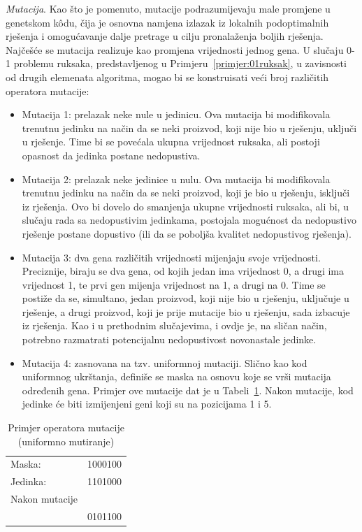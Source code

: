 \documentclass[b5paper, utf8, 11pt, colorlinks]{book}
\theoremstyle{definition}
\begin{document}
\emph{Mutacija}. Kao što je pomenuto, mutacije podrazumijevaju male promjene u genetskom k\^odu, čija je osnovna namjena izlazak iz lokalnih podoptimalnih rješenja i omogućavanje dalje pretrage u cilju pronalaženja boljih rješenja. Najčešće se mutacija realizuje kao promjena vrijednosti jednog gena. U slučaju  0-1 problemu ruksaka, predstavljenog u Primjeru~\ref{primjer:01ruksak}, u zavisnosti od drugih elemenata algoritma, mogao bi se konstruisati veći broj različitih operatora mutacije: 
\begin{itemize}
	\item Mutacija 1: prelazak neke nule u jedinicu. Ova mutacija bi modifikovala trenutnu jedinku na način da se neki proizvod, koji nije bio u rješenju, uključi u rješenje. Time bi se povećala ukupna vrijednost ruksaka, ali postoji opasnost da jedinka postane nedopustiva.
	\item  Mutacija 2: prelazak neke jedinice u nulu. Ova mutacija bi modifikovala trenutnu jedinku na način da se neki proizvod, koji je bio u rješenju, isključi iz rješenja. Ovo bi dovelo do smanjenja ukupne vrijednosti ruksaka, ali bi, u slučaju rada sa nedopustivim jedinkama, postojala mogućnost da nedopustivo rješenje postane dopustivo (ili da se poboljša kvalitet nedopustivog rješenja).
	\item  Mutacija 3: dva gena različitih vrijednosti mijenjaju svoje vrijednosti. Preciznije, biraju se dva gena, od kojih jedan ima vrijednost 0, a drugi ima vrijednost 1, te prvi gen mijenja vrijednost na 1, a drugi na 0. Time se postiže da se, simultano, jedan proizvod, koji nije bio u rješenju, uključuje u rješenje, a drugi proizvod, koji je prije mutacije bio u rješenju, sada izbacuje iz rješenja. Kao i u prethodnim slučajevima, i ovdje je, na sličan način, potrebno razmatrati potencijalnu nedopustivost novonastale jedinke.
	\item Mutacija 4: zasnovana na tzv. uniformnoj mutaciji. Slično kao kod uniformnog ukrštanja, definiše se maska na osnovu koje se vrši mutacija određenih gena. Primjer ove mutacije dat je u Tabeli~\ref{tbl:unimut}. Nakon mutacije, kod jedinke će biti izmijenjeni geni koji su na pozicijama 1 i 5.
\end{itemize}



\begin{table}[H]
	\centering
	\begin{tabular}{lc}
		Maska:  &  1000100  \\
		Jedinka: & 1101000  \\ \hline
		Nakon mutacije &       \\
		               & 0101100      \\
	\end{tabular}	
	\caption{Primjer operatora mutacije (uniformno mutiranje)}\label{tbl:unimut}
\end{table}
\end{document}
